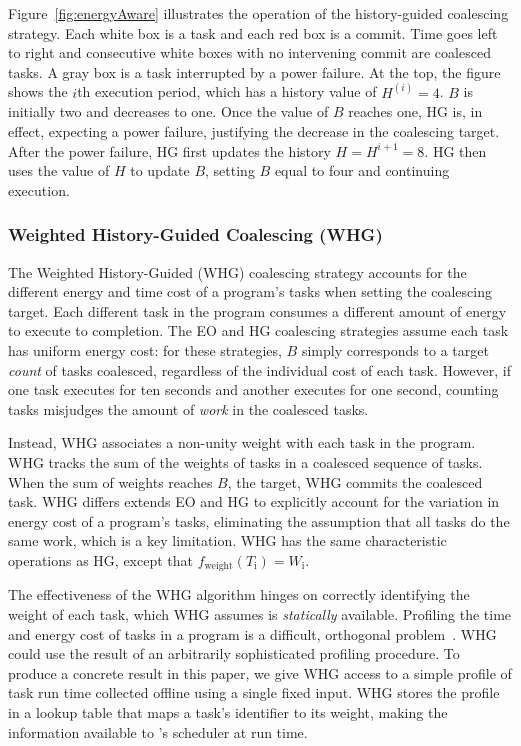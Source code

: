 Figure~\ref{fig:energyAware} illustrates the operation of the history-guided
coalescing strategy.  Each white box is a task and each red box is a commit.
Time goes left to right and consecutive white boxes with no intervening commit
are coalesced tasks.  A gray box is a task interrupted by a power failure.  At
the top, the figure shows the $i$th execution period, which has a history
value of $H^{(i)} = 4$.  $B$ is initially two and decreases to one.  Once the
value of $B$ reaches one, HG is, in effect, expecting a power failure,
justifying the decrease in the coalescing target.  After the power failure, HG
first updates the history $H = H^{i+1} = 8$. HG then uses the value of $H$ to
update $B$, setting $B$ equal to four and continuing execution.  


\subsubsection{Weighted History-Guided Coalescing (WHG)}
\label{subsec:energyTaskAware}

The Weighted History-Guided (WHG) coalescing strategy accounts for the
different energy and time cost of a program's tasks when setting the coalescing
target.
%
Each different task in the program consumes a different amount of energy to
execute to completion.  
%
The EO and HG coalescing strategies assume each task has uniform energy cost:
for these strategies, $B$ simply corresponds to a target {\em count} of tasks
coalesced, regardless of the individual cost of each task.
%
However, if one task executes for ten seconds and another executes for one
second, counting tasks misjudges the amount of {\em work} in the coalesced
tasks.

Instead, WHG associates a non-unity weight with each task in the program. 
%
WHG tracks the sum of the weights of tasks in a coalesced sequence of tasks.
%
When the sum of weights reaches $B$, the target, WHG commits the coalesced
task.
%
WHG differs extends EO and HG to explicitly account for the variation in energy
cost of a program's tasks, eliminating the assumption that all tasks do the
same work, which is a key limitation.
%
WHG has the same characteristic operations as HG, except that
$f_\text{weight}(T_\text{i}) = W_\text{i}$.

The effectiveness of the WHG algorithm hinges on correctly identifying the
weight of each task, which WHG assumes is {\em statically} available.
%
Profiling the time and energy cost of tasks in a program is a difficult,
orthogonal problem~\cite{cleancut_2018,baghsorkhi_cgo_2018}.
%
WHG could use the result of an arbitrarily sophisticated profiling procedure.
%
To produce a concrete result in this paper, we give WHG access to a simple
profile of task run time collected offline using a single fixed input.
%
WHG stores the profile in a lookup table that maps a task's identifier to its
weight, making the information available to \sys's scheduler at run time.
